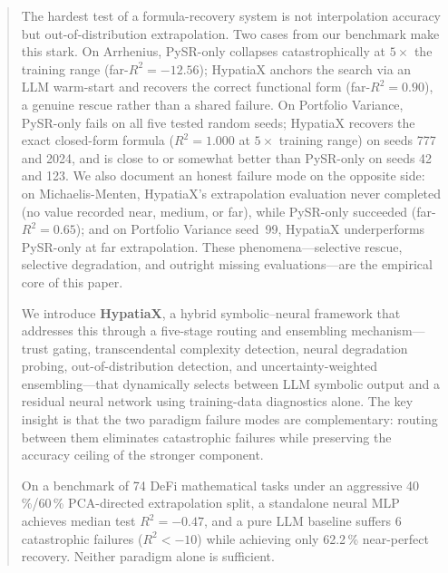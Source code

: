 \documentclass[twoside,11pt]{article}
\newcommand{\Rsq}{R^{2}}
\begin{document}
\begin{abstract}
The hardest test of a formula-recovery system is not interpolation accuracy but
out-of-distribution extrapolation.  Two cases from our benchmark make this stark.
On Arrhenius, PySR-only collapses catastrophically at $5\times$ the
training range (far-$\Rsq = -12.56$); HypatiaX anchors the search via an
LLM warm-start and recovers the correct functional form (far-$\Rsq = 0.90$),
a genuine rescue rather than a shared failure. On Portfolio
Variance, PySR-only fails on all five tested random seeds; HypatiaX recovers
the exact closed-form formula ($\Rsq=1.000$ at $5\times$ training range) on
seeds 777 and 2024, and is close to or somewhat better than PySR-only on
seeds 42 and 123. We also document an honest failure mode on the opposite
side: on Michaelis-Menten, HypatiaX's extrapolation evaluation never
completed (no value recorded near, medium, or far), while PySR-only
succeeded (far-$\Rsq = 0.65$); and on Portfolio Variance seed~99, HypatiaX
underperforms PySR-only at far extrapolation. These phenomena---selective
rescue, selective degradation, and outright missing evaluations---are the
empirical core of this paper.

We introduce \textbf{HypatiaX}, a hybrid symbolic--neural framework that
addresses this through a five-stage routing and ensembling mechanism---trust
gating, transcendental complexity detection, neural degradation probing,
out-of-distribution detection, and uncertainty-weighted ensembling---that
dynamically selects between LLM symbolic output and a residual neural network
using training-data diagnostics alone.  The key insight is that the two paradigm
failure modes are complementary: routing between them eliminates catastrophic
failures while preserving the accuracy ceiling of the stronger component.

On a benchmark of 74 DeFi mathematical tasks under an aggressive
40\,\%/60\,\% PCA-directed extrapolation split, a standalone neural MLP achieves
median test $\Rsq = -0.47$, and a pure LLM baseline suffers 6 catastrophic
failures ($\Rsq < -10$) while achieving only 62.2\,\% near-perfect recovery.
Neither paradigm alone is sufficient.


\end{abstract}
\end{document}
